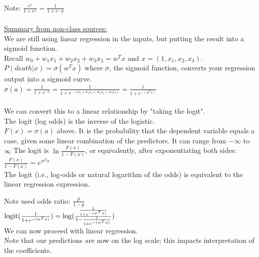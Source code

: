 \hfill \\
Note: $ \displaystyle \frac{e^x}{1 + e^x} = \frac{1}{1 + e^-x}$ \hfill \\  %

\hfill \\ 

\underline{Summary from non-class sources:} \hfill \\
We are still using linear regression in the inputs, but putting the result into a sigmoid function. \hfill \\
Recall $w_0 + w_1 x_1 + w_2 x_2 + w_3 x_3 = w^Tx$ and $x = (1, x_1, x_2, x_3)$.  \hfill \\
$P(death|x) = \sigma(w^Tx)$  %
where $\sigma$, the sigmoid function,  converts your regression output into a sigmoid curve. \hfill \\
$\displaystyle \sigma(a) = \frac{1}{1+ e^{-a}} = \frac{1}{1+ e^{-(w_0 + w_1 x_1 + w_2 x_2 + w_3 x_3)}} = \frac{1}{1+ e^{-(w^Tx)}}$   \hfill \\ %
\hfill \\

We can convert this to a linear relationship by "taking the logit". \hfill \\
The logit (log odds) is the inverse of the logistic.  \hfill \\ %
$F(x) = \sigma(a)$ above.  It is the probability that the dependent variable equals a case, given some linear combination of the predictors.  It can range from $- \infty$ to $\infty$   %
The logit is $\ln \frac{F(x)}{1-F(x)}$, or equivalently, after exponentiating both sides: \hfill \\
$\frac{F(x)}{1-F(x)} = e^{w^Tx}$  \hfill \\
The logit (i.e., log-odds or natural logarithm of the odds) is equivalent to the linear regression expression.

 


Note used odds ratio: $\frac{p}{1-p}$  \hfill \\
$\textrm{logit}(\frac{1}{1+ e^{-(w^Tx)}}) = \log(\frac{\frac{1}{1+ e^{-(w^Tx)}}}{1-\frac{1}{1+ e^{-(w^Tx)}}}) $  \hfill \\ %
We can now proceed with linear regression.  \hfill \\
Note that our predictions are now on the log scale; this impacts interpretation of the coefficients.  \hfill \\  %

